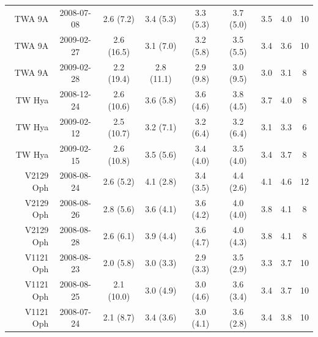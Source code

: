\documentclass{aa}
\begin{document}
\begin{table}
\begin{tabular}{r c c | c | c | c c c c}
TWA 9A    	&2008-07-08	& 2.6 (7.2) 	& 3.4 (5.3)    	& 3.3 (5.3) 	& 3.7 (5.0) 	& 3.5 	& 4.0 	& 10 \\ 
TWA 9A    	&2009-02-27	& 2.6 (16.5) 	& 3.1 (7.0)    	& 3.2 (5.8) 	& 3.5 (5.5) 	& 3.4 	& 3.6 	& 10 \\ 
TWA 9A    	&2009-02-28	& 2.2 (19.4) 	& 2.8 (11.1)    	& 2.9 (9.8) 	& 3.0 (9.5) 	& 3.0 	& 3.1 	& 8 \\ 
TW Hya    	&2008-12-24	& 2.6 (10.6) 	& 3.6 (5.8)    	& 3.6 (4.6) 	& 3.8 (4.5) 	& 3.7 	& 4.0 	& 8 \\ 
TW Hya    	&2009-02-12	& 2.5 (10.7) 	& 3.2 (7.1)    	& 3.2 (6.4) 	& 3.2 (6.4) 	& 3.1 	& 3.3 	& 6 \\ 
TW Hya    	&2009-02-15	& 2.6 (10.8) 	& 3.5 (5.6)    	& 3.4 (4.0) 	& 3.5 (4.0) 	& 3.4 	& 3.7 	& 8 \\ 
V2129 Oph 	&2008-08-24	& 2.6 (5.2) 	& 4.1 (2.8)    	& 3.4 (3.5) 	& 4.4 (2.6) 	& 4.1 	& 4.6 	& 12 \\ 
V2129 Oph 	&2008-08-26	& 2.8 (5.6) 	& 3.6 (4.1)    	& 3.6 (4.2) 	& 4.0 (4.0) 	& 3.8 	& 4.1 	& 8 \\ 
V2129 Oph 	&2008-08-28	& 2.6 (6.1) 	& 3.9 (4.4)    	& 3.6 (4.7) 	& 4.0 (4.3) 	& 3.8 	& 4.1 	& 8 \\ 
V1121 Oph 	&2008-08-23	& 2.0 (5.8) 	& 3.0 (3.3)    	& 2.9 (3.3) 	& 3.5 (2.9) 	& 3.3 	& 3.7 	& 10 \\ 
V1121 Oph 	&2008-08-25	& 2.1 (10.0) 	& 3.0 (4.9)    	& 3.0 (4.6) 	& 3.6 (3.4) 	& 3.4 	& 3.7 	& 10 \\ 
V1121 Oph 	&2008-07-24	& 2.1 (8.7) 	& 3.4 (3.6)    	& 3.0 (4.1) 	& 3.6 (2.8) 	& 3.4 	& 3.8 	& 10 \\ 

\hline
\end{tabular}
\end{table}

\end{document}
